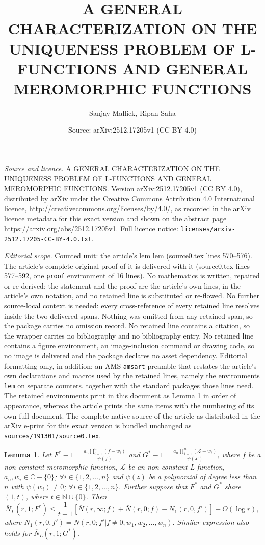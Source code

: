 \documentclass[10pt,a4paper]{amsart}
\title{A GENERAL CHARACTERIZATION ON THE UNIQUENESS PROBLEM OF L-FUNCTIONS AND GENERAL MEROMORPHIC FUNCTIONS}
\author{Sanjay Mallick, Ripan Saha}
\date{Source: arXiv:2512.17205v1 (CC BY 4.0)}
\newtheorem{lem}{Lemma}
\newcommand{\be}{\begin{equation}}
\renewcommand{\d}{\displaystyle}
\newcommand{\ee}{\end{equation}}
\renewcommand{\leq}{\leqslant}\renewcommand{\geq}{\geqslant}
\newcommand{\ol}{\overline}
\begin{document}
\maketitle

\noindent\emph{Source and licence.} A GENERAL CHARACTERIZATION ON THE UNIQUENESS PROBLEM OF L-FUNCTIONS AND GENERAL MEROMORPHIC FUNCTIONS. Version arXiv:2512.17205v1 (CC BY 4.0), distributed by arXiv under the Creative Commons Attribution 4.0 International licence, http://creativecommons.org/licenses/by/4.0/, as recorded in the arXiv licence metadata for this exact version and shown on the abstract page https://arxiv.org/abs/2512.17205v1. Full licence notice: \texttt{licenses/arxiv-2512.17205-CC-BY-4.0.txt}.\par\smallskip

\noindent\textit{Editorial scope.} Counted unit: the article's lem lem (source0.tex lines 570--576). The article's complete original proof of it is delivered with it (source0.tex lines 577--592, one \texttt{proof} environment of 16 lines). No mathematics is written, repaired or re-derived: the statement and the proof are the article's own lines, in the article's own notation, and no retained line is substituted or re-flowed.  No further source-local context is needed: every cross-reference of every retained line resolves inside the two delivered spans.  Nothing was omitted from any retained span, so the package carries no omission record.  No retained line contains a citation, so the wrapper carries no bibliography and no bibliography entry.  No retained line contains a figure environment, an image-inclusion command or drawing code, so no image is delivered and the package declares no asset dependency.  Editorial formatting only, in addition: an AMS \texttt{amsart} preamble that restates the article's own declarations and macros used by the retained lines, namely the environments \texttt{lem} on separate counters, together with the standard packages those lines need.  The retained environments print in this document as Lemma 1 in order of appearance, whereas the article prints the same items with the numbering of its own full document.  The complete native source of the article as distributed in the arXiv e-print for this exact version is bundled unchanged as \texttt{sources/191301/source0.tex}.
\begin{lem}
Let $F^{*}-1=\d\frac{a_{n}\prod\limits_{i=1}^{n}(f-w_{i})}{\psi(f)}$ and $G^{*}-1=\d\frac{a_{n}\prod\limits_{i=1}^{n}(\mathcal{L}-w_{i})}{\psi(\mathcal
{L})}$, where $f$  be a non-constant meromorphic function, $\mathcal{L}$ be an non-constant L-function, $a_{n},w_{i}\in\mathbb{C}-\{0\}$; $\forall i\in\{1,2,\ldots,n\}$ and  $\psi(z)$ be a polynomial of degree less than $n$ with $\psi(w_{i})\neq0$; $\forall i\in\{1,2,\ldots,n\}$. Further suppose that $F^{*}$ and $G^{*}$  share $(1,t)$, where $t\in\mathbb{N}\cup\{0\}$.  Then 
\be\nonumber \ol{N}_L(r,1;F^{*})\leq \frac{1}{t+1}\left[\ol{ N}(r,\infty;f)+\ol{ N}(r,0;f)-N_1(r,0,f')\right]+O(\log r),\ee
where $N_1(r,0,f')=N(r,0;f'|f\ne 0,w_1,w_2,...,w_n).$
Similar expression also holds for $\ol  N_L(r,1;G^{*})$.
\end{lem}
\end{document}
